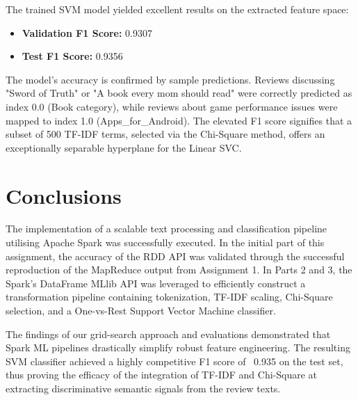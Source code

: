 \documentclass[11pt,a4paper]{article}
\begin{document}
The trained SVM model yielded excellent results on the extracted feature space:
\begin{itemize}
    \item \textbf{Validation F1 Score:} 0.9307
    \item \textbf{Test F1 Score:} 0.9356
\end{itemize}
The model's accuracy is confirmed by sample predictions. Reviews discussing "Sword of Truth" or "A book every mom should read" were correctly predicted as index 0.0 (Book category), while reviews about game performance issues were mapped to index 1.0 (Apps\_for\_Android). The elevated F1 score signifies that a subset of 500 TF-IDF terms, selected via the Chi-Square method, offers an exceptionally separable hyperplane for the Linear SVC.

\section{Conclusions}

The implementation of a scalable text processing and classification pipeline utilising Apache Spark was successfully executed. In the initial part of this assignment, the accuracy of the RDD API was validated through the successful reproduction of the MapReduce output from Assignment 1. In Parts 2 and 3, the Spark's DataFrame MLlib API was leveraged to efficiently construct a transformation pipeline containing tokenization, TF-IDF scaling, Chi-Square selection, and a One-vs-Rest Support Vector Machine classifier. 

The findings of our grid-search approach and evaluations demonstrated that Spark ML pipelines drastically simplify robust feature engineering. The resulting SVM classifier achieved a highly competitive F1 score of ~0.935 on the test set, thus proving the efficacy of the integration of TF-IDF and Chi-Square at extracting discriminative semantic signals from the review texts. 
\end{document}
